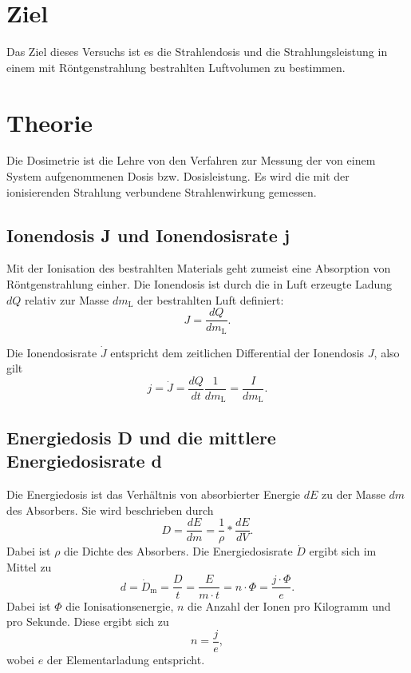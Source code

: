 \section{Ziel}
Das Ziel dieses Versuchs ist es die Strahlendosis und die
Strahlungsleistung in einem mit Röntgenstrahlung bestrahlten
Luftvolumen zu bestimmen.

\section{Theorie}
\label{sec:Theorie}

Die Dosimetrie ist die Lehre von den Verfahren zur Messung 
der von einem System aufgenommenen Dosis bzw. Dosisleistung.
Es wird die mit der ionisierenden Strahlung
verbundene Strahlenwirkung gemessen.


\subsection{Ionendosis J und Ionendosisrate j}
Mit der Ionisation des bestrahlten Materials geht zumeist
eine Absorption von Röntgenstrahlung einher. %
Die Ionendosis ist durch die in Luft erzeugte Ladung $dQ$
relativ zur Masse $dm_\text{L}$ der bestrahlten Luft definiert:
\begin{equation*}
    J = \frac{dQ}{dm_\text{L}}.
    \label{eqn:Ionendosis}
\end{equation*}

Die Ionendosisrate $\dot{J}$ entspricht dem zeitlichen Differential der Ionendosis $J$, also gilt 
\begin{equation}
    j = \dot{J} =\frac{dQ}{dt} \frac{1}{dm_\text{L}} =\frac{I}{dm_\text{L}} .
    \label{eqn:Ionendosisrate}
\end{equation}

\subsection{Energiedosis D und die mittlere Energiedosisrate d}
Die Energiedosis ist das Verhältnis von absorbierter
Energie $dE$ zu der Masse $dm$ des Absorbers.
Sie wird beschrieben durch
\begin{equation*}
    D = \frac{dE}{dm} = \frac{1}{\rho} * \frac{dE}{dV}.
    \label{eqn:Energiedosis}
\end{equation*}
Dabei ist $\rho$ die Dichte des Absorbers.
Die Energiedosisrate $\dot{D}$ ergibt sich im Mittel zu 
\begin{equation}
    d = \dot{D}_\text{m} = \frac{D}{t} =\frac{E}{m \cdot t} = n \cdot \Phi = \frac{j \cdot \Phi}{e}.
    \label{eqn:Energiedosisrate}
\end{equation}
Dabei ist $\Phi$ die Ionisationsenergie, $n$ die Anzahl der Ionen pro Kilogramm und pro Sekunde. 
Diese ergibt sich zu
\begin{equation*}
    n = \frac{j}{e},
    \label{eqn:Ionenanzahl}
\end{equation*}
wobei $e$ der Elementarladung entspricht. 

